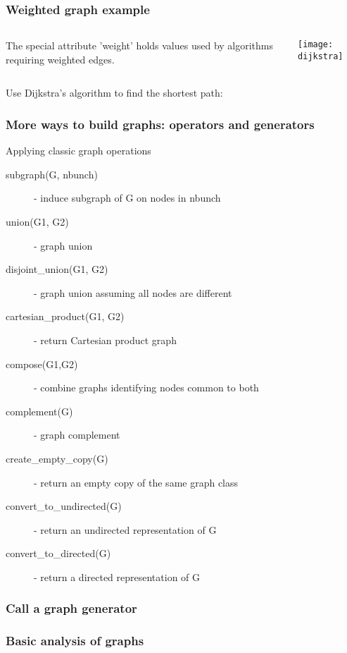 \begin{frame}[fragile]
\frametitle{Weighted graph example}
\begin{columns}
\begin{column}{0.7\textwidth}
The special attribute 'weight'
holds values used by algorithms requiring weighted edges.

\end{column}

\begin{column}{0.3\textwidth}
\centerline{\texttt{[image: dijkstra]}}
\end{column}
\end{columns}

\begin{block}{}
Use Dijkstra's algorithm to find the shortest path:



\end{block}

\end{frame}

\begin{frame}[fragile]
\frametitle{More ways to build graphs: operators and generators}

Applying classic graph operations

\begin{description}

\item[subgraph(G, nbunch)]      - induce subgraph of G on nodes in nbunch
\item[union(G1, G2)] - graph union
\item[disjoint\_union(G1, G2)]   - graph union assuming all nodes are different
\item[cartesian\_product(G1, G2)] - return Cartesian product graph
\item[compose(G1,G2)]           - combine graphs identifying nodes common to both
\item[complement(G)]            - graph complement
\item[create\_empty\_copy(G)]     - return an empty copy of the same graph class
\item[convert\_to\_undirected(G)] - return an undirected representation of G
\item[convert\_to\_directed(G)]   - return a directed representation of G
\end{description}

\end{frame}

\begin{frame}
\frametitle{Call a graph generator}


\end{frame}

\begin{frame}[fragile]
\frametitle{Basic analysis of graphs}




\end{frame}
